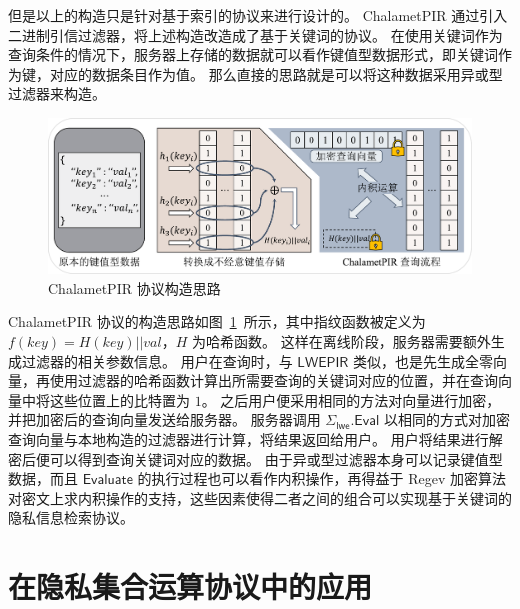 但是以上的构造只是针对基于索引的协议来进行设计的。
ChalametPIR 通过引入二进制引信过滤器，将上述构造改造成了基于关键词的协议。
在使用关键词作为查询条件的情况下，服务器上存储的数据就可以看作键值型数据形式，即关键词作为键，对应的数据条目作为值。
那么直接的思路就是可以将这种数据采用异或型过滤器来构造。
\begin{figure}[ht]
  \centering
  \includegraphics[width=\textwidth]{figures/pir_exp.pdf}
  \caption{ChalametPIR 协议构造思路}
  \label{fig:pir_exp}
\end{figure}
ChalametPIR 协议的构造思路如图~\ref{fig:pir_exp}~所示，其中指纹函数被定义为 $f(key) = H(key) || val$，$H$ 为哈希函数。
这样在离线阶段，服务器需要额外生成过滤器的相关参数信息。
用户在查询时，与 $\mathsf{LWEPIR}$ 类似，也是先生成全零向量，再使用过滤器的哈希函数计算出所需要查询的关键词对应的位置，并在查询向量中将这些位置上的比特置为 $1$。
之后用户便采用相同的方法对向量进行加密，并把加密后的查询向量发送给服务器。
服务器调用 $\Sigma_{\mathsf{lwe}}.\mathsf{Eval}$ 以相同的方式对加密查询向量与本地构造的过滤器进行计算，将结果返回给用户。
用户将结果进行解密后便可以得到查询关键词对应的数据。
由于异或型过滤器本身可以记录键值型数据，而且 $\mathsf{Evaluate}$ 的执行过程也可以看作内积操作，再得益于 Regev 加密算法对密文上求内积操作的支持，这些因素使得二者之间的组合可以实现基于关键词的隐私信息检索协议。


\section{在隐私集合运算协议中的应用}

